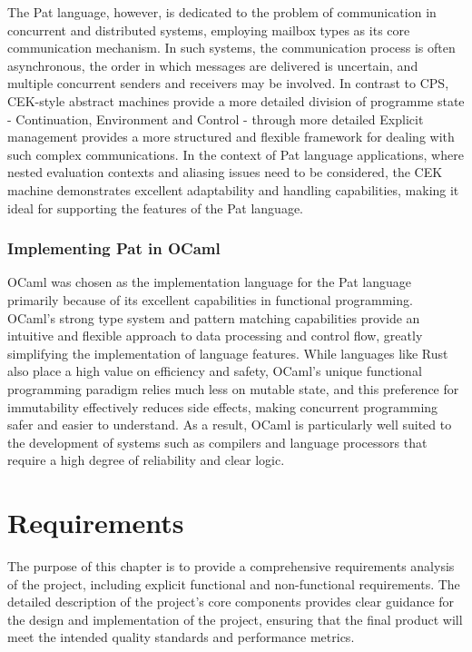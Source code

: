 \documentclass{l4proj}
\begin{document}
The Pat language, however, is dedicated to the problem of communication in concurrent and distributed systems, employing mailbox types as its core communication mechanism. In such systems, the communication process is often asynchronous, the order in which messages are delivered is uncertain, and multiple concurrent senders and receivers may be involved. In contrast to CPS, CEK-style abstract machines provide a more detailed division of programme state - Continuation, Environment and Control - through more detailed Explicit management provides a more structured and flexible framework for dealing with such complex communications. In the context of Pat language applications, where nested evaluation contexts and aliasing issues need to be considered, the CEK machine demonstrates excellent adaptability and handling capabilities, making it ideal for supporting the features of the Pat language.

\subsection{Implementing Pat in OCaml}
OCaml was chosen as the implementation language for the Pat language primarily because of its excellent capabilities in functional programming. OCaml's strong type system and pattern matching capabilities provide an intuitive and flexible approach to data processing and control flow, greatly simplifying the implementation of language features. While languages like Rust also place a high value on efficiency and safety, OCaml's unique functional programming paradigm relies much less on mutable state, and this preference for immutability effectively reduces side effects, making concurrent programming safer and easier to understand. As a result, OCaml is particularly well suited to the development of systems such as compilers and language processors that require a high degree of reliability and clear logic.


\chapter{Requirements}

The purpose of this chapter is to provide a comprehensive requirements analysis of the project, including explicit functional and non-functional requirements. The detailed description of the project's core components provides clear guidance for the design and implementation of the project, ensuring that the final product will meet the intended quality standards and performance metrics.
\end{document}
